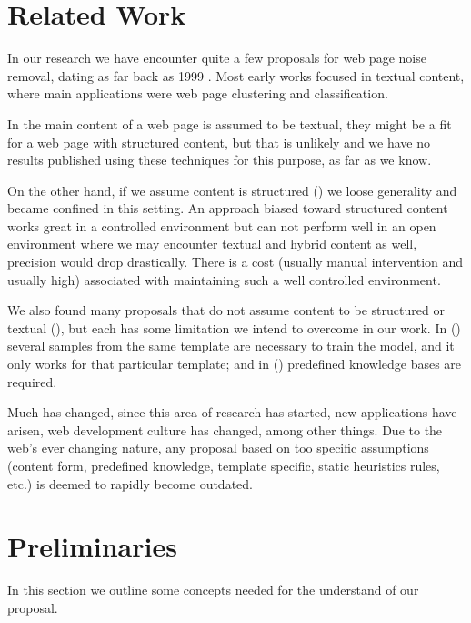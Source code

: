 \section{Related Work}\label{sec:related}

In our research we have encounter quite a few proposals for web page noise
removal, dating as far back as 1999 \cite{kushmerick1999learning}. Most early
works focused in textual content, where main applications were web page
clustering and classification.

In \cite{Densiometric08,Boilerplate10, vieira2006fast, BlockImp07} the main
content of a web page is assumed to be textual, they might be a fit for a web
page with structured content, but that is unlikely and we have no results
published using these techniques for this purpose, as far as we know.

On the other hand, if we assume content is structured
(\cite{TPS2013,Velloso:2017:ERW:3132847.3132875}) we loose generality and became
confined in this setting. An approach biased toward structured content works
great in a controlled environment but can not perform well in an open
environment where we may encounter textual and hybrid content as well, precision
would drop drastically. There is a cost (usually manual intervention and usually
high) associated with maintaining such a well controlled environment.

We also found many proposals that do not assume content to be structured or
textual (\cite{Noisy03,Jointop07,SiteOriented11,Entropy09}), but each has some
limitation we intend to overcome in our work. In
(\cite{Jointop07,SiteOriented11,Noisy03}) several samples from the same template
are necessary to train the model, and it only works for that particular
template; and in (\cite{Entropy09}) predefined knowledge bases are required.

Much has changed, since this area of research has started, new applications have
arisen, web development culture has changed, among other things. Due to the
web's ever changing nature, any proposal based on too specific assumptions
(content form, predefined knowledge, template specific, static heuristics rules,
etc.) is deemed to rapidly become outdated.

\section{Preliminaries}\label{sec:prelim}
In this section we outline some concepts needed for the understand of our
proposal.

